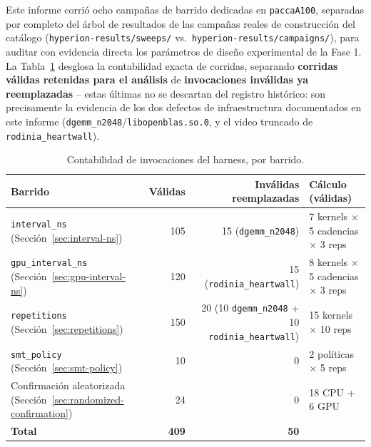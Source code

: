 Este informe corrió ocho campañas de barrido dedicadas en \texttt{paccaA100},
separadas por completo del árbol de resultados de las campañas reales de
construcción del catálogo (\texttt{hyperion-results/sweeps/} vs.\
\texttt{hyperion-results/campaigns/}), para auditar con evidencia directa
los parámetros de diseño experimental de la Fase 1. La
Tabla~\ref{tab:run-accounting} desglosa la contabilidad exacta de corridas,
separando \textbf{corridas válidas retenidas para el análisis} de
\textbf{invocaciones inválidas ya reemplazadas} -- estas últimas no se
descartan del registro histórico: son precisamente la evidencia de los dos
defectos de infraestructura documentados en este informe
(\texttt{dgemm\_n2048}/\texttt{libopenblas.so.0}, y el video truncado de
\texttt{rodinia\_heartwall}).

\begin{table}[H]
\centering
\caption{Contabilidad de invocaciones del harness, por barrido.}
\label{tab:run-accounting}
\small
\begin{tabular}{@{}lrrl@{}}
\toprule
\textbf{Barrido} & \textbf{Válidas} & \textbf{Inválidas reemplazadas} & \textbf{Cálculo (válidas)} \\
\midrule
\texttt{interval\_ns} (Sección~\ref{sec:interval-ns}) & 105 & 15 (\texttt{dgemm\_n2048}) & 7 kernels $\times$ 5 cadencias $\times$ 3 reps \\
\texttt{gpu\_interval\_ns} (Sección~\ref{sec:gpu-interval-ns}) & 120 & 15 (\texttt{rodinia\_heartwall}) & 8 kernels $\times$ 5 cadencias $\times$ 3 reps \\
\texttt{repetitions} (Sección~\ref{sec:repetitions}) & 150 & 20 (10 \texttt{dgemm\_n2048} + 10 \texttt{rodinia\_heartwall}) & 15 kernels $\times$ 10 reps \\
\texttt{smt\_policy} (Sección~\ref{sec:smt-policy}) & 10 & 0 & 2 políticas $\times$ 5 reps \\
Confirmación aleatorizada (Sección~\ref{sec:randomized-confirmation}) & 24 & 0 & 18 CPU + 6 GPU \\
\midrule
\textbf{Total} & \textbf{409} & \textbf{50} & \\
\bottomrule
\end{tabular}
\end{table}

